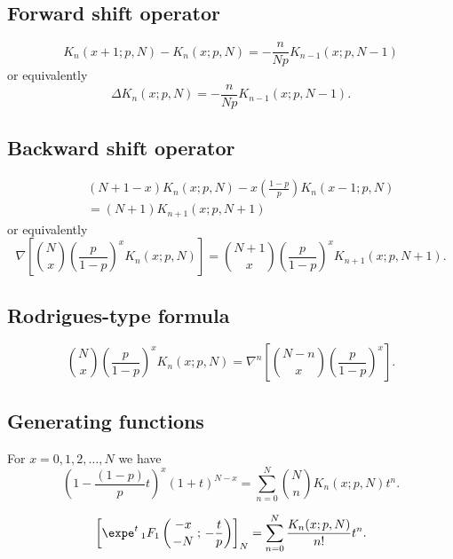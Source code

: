 \documentclass[envcountchap,graybox]{svmono}
\newcommand{\hyp}[5]{\mbox{}_{#1}{F}_{#2}
\left(\genfrac{}{}{0pt}{}{#3}{#4}\,;\,#5\right)}
\newcommand{\hyp}[5]{\,\mbox{}_{#1}F_{#2}\!\left(
  \genfrac{}{}{0pt}{}{#3}{#4};#5\right)}
\begin{document}
\subsection*{Forward shift operator}
\begin{equation}
\label{shift1KrawtchoukI}
K_n(x+1;p,N)-K_n(x;p,N)=-\frac{n}{Np}K_{n-1}(x;p,N-1)
\end{equation}
or equivalently
\begin{equation}
\label{shift1KrawtchoukII}
\Delta K_n(x;p,N)=-\frac{n}{Np}K_{n-1}(x;p,N-1).
\end{equation}

\subsection*{Backward shift operator}
\begin{eqnarray}
\label{shift2KrawtchoukI}
& &(N+1-x)K_n(x;p,N)-x\left(\frac{1-p}{p}\right)K_n(x-1;p,N)\nonumber\\
& &{}=(N+1)K_{n+1}(x;p,N+1)
\end{eqnarray}
or equivalently
\begin{equation}
\label{shift2KrawtchoukII}
\nabla\left[\binom{N}{x}\left(\frac{p}{1-p}\right)^xK_n(x;p,N)\right]=
\binom{N+1}{x}\left(\frac{p}{1-p}\right)^xK_{n+1}(x;p,N+1).
\end{equation}

\subsection*{Rodrigues-type formula}
\begin{equation}
\label{RodKrawtchouk}
\binom{N}{x}\left(\frac{p}{1-p}\right)^xK_n(x;p,N)=
\nabla^n\left[\binom{N-n}{x}\left(\frac{p}{1-p}\right)^x\right].
\end{equation}

\subsection*{Generating functions}
For $x=0,1,2,\ldots,N$ we have
\begin{equation}
\label{GenKrawtchouk1}
\left(1-\frac{(1-p)}{p}t\right)^x(1+t)^{N-x}=
\sum_{n=0}^N\binom{N}{n}K_n(x;p,N)t^n.
\end{equation}

\begin{equation}
\label{GenKrawtchouk2}
\left[\expe^t\,\hyp{1}{1}{-x}{-N}{-\frac{t}{p}}\right]_N=
\sum_{n=0}^N\frac{K_n(x;p,N)}{n!}t^n.
\end{equation}
\end{document}
